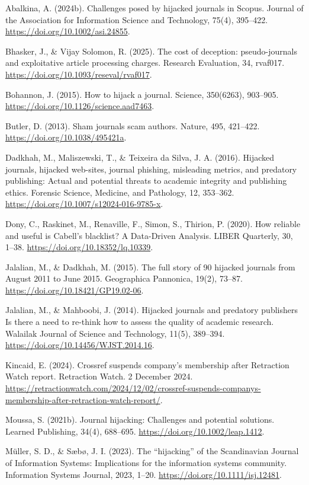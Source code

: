 \documentclass[a4paper,
fontsize=11pt,
oneside,
numbers=noperiodatend,
parskip=half-,
bibliography=totoc,
final
]{scrartcl}
\begin{document}
Abalkina, A. (2024b). Challenges posed by hijacked journals in Scopus.
Journal of the Association for Information Science and Technology,
75(4), 395--422. \url{https://doi.org/10.1002/asi.24855}.

Bhasker, J., \& Vijay Solomon, R. (2025). The cost of deception:
pseudo-journals and exploitative article processing charges. Research
Evaluation, 34, rvaf017. \url{https://doi.org/10.1093/reseval/rvaf017}.

Bohannon, J. (2015). How to hijack a journal. Science, 350(6263),
903--905. \url{https://doi.org/10.1126/science.aad7463}.

Butler, D. (2013). Sham journals scam authors. Nature, 495, 421--422.
\url{https://doi.org/10.1038/495421a}.

Dadkhah, M., Maliszewski, T., \& Teixeira da Silva, J. A. (2016).
Hijacked journals, hijacked web-sites, journal phishing, misleading
metrics, and predatory publishing: Actual and potential threats to
academic integrity and publishing ethics. Forensic Science, Medicine,
and Pathology, 12, 353--362.
\url{https://doi.org/10.1007/s12024-016-9785-x}.

Dony, C., Raskinet, M., Renaville, F., Simon, S., Thirion, P. (2020).
How reliable and useful is Cabell's blacklist? A Data-Driven Analysis.
LIBER Quarterly, 30, 1--38. \url{https://doi.org/10.18352/lq.10339}.

Jalalian, M., \& Dadkhah, M. (2015). The full story of 90 hijacked
journals from August 2011 to June 2015. Geographica Pannonica, 19(2),
73--87. \url{https://doi.org/10.18421/GP19.02-06}.

Jalalian, M., \& Mahboobi, J. (2014). Hijacked journals and predatory
publishers Is there a need to re-think how to assess the quality of
academic research. Walailak Journal of Science and Technology, 11(5),
389--394. \url{https://doi.org/10.14456/WJST.2014.16}.

Kincaid, E. (2024). Crossref suspends company's membership after
Retraction Watch report. Retraction Watch. 2 December 2024.
\url{https://retractionwatch.com/2024/12/02/crossref-suspends-companys-membership-after-retraction-watch-report/}.

Moussa, S. (2021b). Journal hijacking: Challenges and potential
solutions. Learned Publishing, 34(4), 688--695.
\url{https://doi.org/10.1002/leap.1412}.

Müller, S. D., \& Sæbø, J. I. (2023). The \enquote{hijacking} of the
Scandinavian Journal of Information Systems: Implications for the
information systems community. Information Systems Journal, 2023, 1--20.
\url{https://doi.org/10.1111/isj.12481}.
\end{document}

